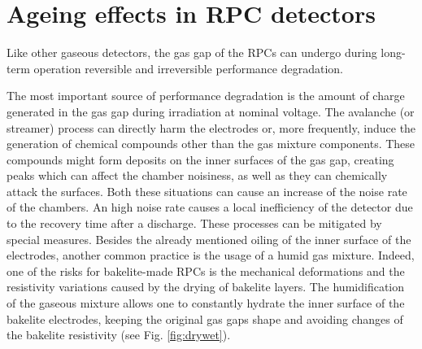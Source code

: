 

\section{Ageing effects in RPC detectors}
Like other gaseous detectors, the gas gap of the RPCs can undergo during long-term operation reversible and irreversible performance degradation.

The most important source of performance degradation is the amount of charge generated in the gas gap during irradiation at nominal voltage.
The avalanche (or streamer) process can directly harm the electrodes or, more frequently, induce the generation of chemical compounds other than the gas mixture components.
These compounds might form deposits on the inner surfaces of the gas gap, creating peaks which can affect the chamber noisiness, as well as they can chemically attack the surfaces.
Both these situations can cause an increase of the noise rate of the chambers.
An high noise rate causes a local inefficiency of the detector due to the recovery time after a discharge.
These processes can be mitigated by special measures.
Besides the already mentioned oiling of the inner surface  of the electrodes, another common practice is the usage of a humid gas mixture.
Indeed, one of the risks for bakelite-made RPCs is the mechanical deformations and the resistivity variations caused by the drying of bakelite layers.
The humidification of the gaseous mixture allows one to constantly hydrate the inner surface of the bakelite electrodes, keeping the original gas gaps shape and avoiding changes of the bakelite resistivity (see Fig. \ref{fig:drywet}).

